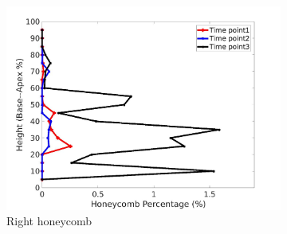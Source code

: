 \begin{figure}[H]
\begin{subfigure}{.42\linewidth}
  \includegraphics[width=\linewidth,trim={{.0\wd0} {.0\wd0} {.0\wd0} {.0\wd0}},clip]{Appendix/Image_AppexA/BaseToApex/IPF15RightLungHoneycombDiseaseAgainstHeight.jpg}
  \caption{Right honeycomb}
  \label{fig:IPF15DiseaseAgainstHeight-f}
\end{subfigure}
\begin{subfigure}{.42\linewidth}%

\end{subfigure}
\end{figure}
